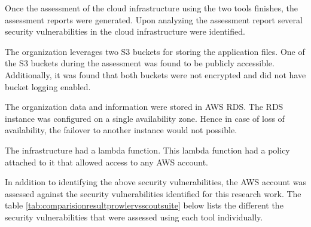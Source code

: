 \par Once the assessment of the cloud infrastructure using
the two tools finishes, the assessment reports were generated.
Upon analyzing the assessment report several security vulnerabilities in the cloud infrastructure were identified.

\par The organization leverages two S3 buckets for storing the application files.
One of the S3 buckets during the assessment was found to be publicly accessible.
Additionally, it was found that both buckets were not encrypted and did not have bucket logging enabled.

\par The organization data and information were stored in AWS RDS. The RDS instance was configured on a single availability zone.
Hence in case of loss of availability, the failover to another instance would not possible.

\par The infrastructure had a lambda function.
This lambda function had a policy attached to it that allowed access to any AWS account.


\par In addition to identifying the above security
vulnerabilities, the AWS account was assessed against the
security
vulnerabilities identified for this research work.
The table \ref{tab:comparisionresultprowlervsscoutsuite}
below lists the different the security
vulnerabilities that were assessed using each tool
individually.

